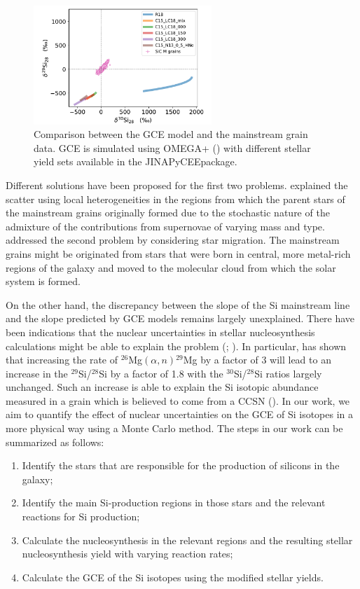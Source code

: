 \documentclass{brandeis-thesis3.2}
\newcommand{\iso}[2]{$^{#1}${#2}}
\begin{document}
\begin{figure}
    \centering
    \includegraphics[width = 0.6\textwidth]{figs/gce_Si_isotope.pdf}
    \caption{Comparison between the GCE model and the mainstream grain data. GCE is simulated using OMEGA+ (\citealt{Cote_2018}) with different stellar yield sets available in the JINAPyCEE\protect\footnotemark  package.}
    \label{fig:gce_si}
\end{figure}

Different solutions have been proposed for the first two problems. \cite{Lugaro1999} explained the scatter using local heterogeneities in the regions from which the parent stars of the mainstream grains originally formed due to the stochastic nature of the admixture of the contributions from supernovae of varying mass and type. \cite{Clayton1997} addressed the second problem by considering star migration. The mainstream grains might be originated from stars that were born in central, more metal-rich regions of the galaxy and moved to the molecular cloud from which the solar system is formed. 

On the other hand, the discrepancy between the slope of the Si mainstream line and the slope predicted by GCE models remains largely unexplained. There have been indications that the nuclear uncertainties in stellar nucleosynthesis calculations might be able to explain the problem (\citealt{Timmes_1996}; \citealt{Hoppe_2009}). In particular, \cite{Hoppe_2009} has shown that increasing the rate of \iso{26}{Mg}$(\alpha, n)$\iso{29}{Mg} by a factor of 3 will lead to an increase in the \iso{29}{Si}/\iso{28}{Si} by a factor of 1.8 with the \iso{30}{Si}/\iso{28}{Si} ratios largely unchanged. Such an increase is able to explain the Si isotopic abundance measured in a grain which is believed to come from a CCSN (\citealt{Hoppe_2009}). In our work, we aim to quantify the effect of nuclear uncertainties on the GCE of Si isotopes in a more physical way using a Monte Carlo method. The steps in our work can be summarized as follows:
\begin{enumerate}
    \item Identify the stars that are responsible for the production of silicons in the galaxy;
    \item Identify the main Si-production regions in those stars and the relevant reactions for Si production;
    \item Calculate the nucleosynthesis in the relevant regions and the resulting stellar nucleosynthesis yield with varying reaction rates;
    \item Calculate the GCE of the Si isotopes using the modified stellar yields.
\end{enumerate}
\end{document}
